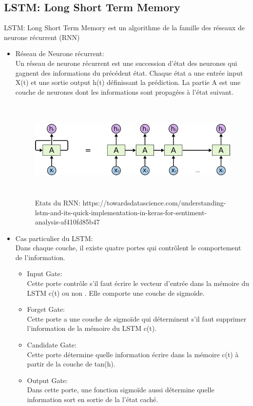 \subsection{LSTM: Long Short Term Memory}
LSTM: Long Short Term Memory est un algorithme de la famille des réseaux de neurone récurrent (RNN)
\begin{itemize}
  	\item Réseau de Neurone récurrent:\\
  		Un réseau de neurone récurrent est une succession d’état des neurones qui gagnent des informations du précédent état. Chaque état a une entrée input X(t) et une sortie output h(t) définissant la prédiction. La partie A est une couche de neurones dont les informations sont propagées à l’état suivant.
  		\begin{figure}[h]
\begin{center}
\includegraphics[width=16cm,height=5cm]{images/rnn_steps.png}
\caption[Etats du RNN: https://towardsdatascience.com/understanding-lstm-and-its-quick-implementation-in-keras-for-sentiment-analysis-af410fd85b47]{Etats du RNN: https://towardsdatascience.com/understanding-lstm-and-its-quick-implementation-in-keras-for-sentiment-analysis-af410fd85b47}
\label{monlabel}
\end{center}
\end{figure}
	\item Cas particulier du LSTM:\\
Dans chaque couche, il existe quatre portes qui contrôlent le comportement de l’information.

	\begin{itemize}
  		\item Input Gate:\\
Cette porte contrôle s’il faut écrire le vecteur d'entrée dans la mémoire du LSTM c(t) ou non . Elle comporte une couche de sigmoïde.
\item Forget Gate:\\
Cette porte a une couche de sigmoïde qui déterminent s’il faut supprimer l’information de la mémoire du LSTM c(t).
\item Candidate Gate:\\
Cette porte détermine quelle information écrire dans la mémoire c(t) à partir de la couche de tan(h).
	\item Output Gate:\\
Dans cette porte, une fonction sigmoïde aussi détermine quelle information sort en sortie de la l’état caché. 


\end{itemize}
\end{itemize}
